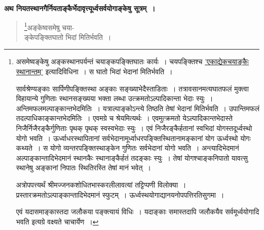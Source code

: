\documentclass[11pt, openany]{book}
\begin{document}
\newpage

\textbf{अथ नियतस्थानगैर्नियताङ्कैर्भेदावृत्त्यूर्ध्वसर्वयोगाङ्केषु सूत्रम्~।}

\begin{quote}
\renewcommand{\thefootnote}{१}\footnote{असमेष्वङ्केषु \;अङ्कस्थानपर्यन्तं \;चयाङ्कपङ्क्तिघातः \;कार्यः~। चयपङ्क्तिश्च \;\hyperref[13.10]{'एकाद्येकचयाङ्कैः \;स्थानान्तम्'} इत्यादिविधिना~। स घातो भिदां भेदानां मितिर्भवति~। 
\vspace{2mm}

\hspace{3mm} सार्वश्रेण्यङ्काः सार्पिणीपङ्क्तिस्था अङ्काः सङ्ख्याभेदैस्ताडिताः~। तत्रावसानमत्यघातफलं मुक्त्वा विहायान्ये गुणिताः स्थानसङ्ख्यया भक्ता लब्धा उत्क्रमतोऽल्पादिकान्ता भेदाः स्युः~। अन्तिमफलमल्पाङ्कान्तभेदमितिः~। यत्राल्पाङ्कोऽन्त्ये तिष्ठति तेषां भेदानां मितिर्भवति~। उपान्तिमफलं तदल्पाधिकाङ्कान्तभेदमितिः~। एवमग्रे च श्रेयमित्यर्थः~। एवमुत्क्रमतो येऽल्पादिकान्तभेदास्ते निजैर्निजैरङ्कैर्गुणिताः पृथक् पृथक् स्वस्वभेदाः स्युः~। एवं निजैरङ्कैर्हतानां स्वभिदां योगस्तदूर्ध्वस्थो योगो भवति~। ऊर्ध्वाधरस्थापितानां सर्वभेदानामूर्ध्वाधरपङ्क्तिस्थितानामङ्कानां योग ऊर्ध्वस्थो योगः कथ्यते~। स योगो व्यन्तरपङ्क्तिस्थाङ्केन गुणितः सर्वभेदानां योगो भवति~। अन्त्यादिभेदमानं अल्पाङ्कान्तादिभेदमानं स्थानकैः स्थानाङ्कैर्हतं तदङ्काः स्युः~। तेषां योगश्चाङ्कनिपातो यावत्सु स्थानेषु अङ्कानां निपातः स्थितिरस्ति तेषां मानं भवेत्~।
\vspace{2mm}

\hspace{3mm} अत्रोपपत्त्यर्थं श्रीमज्जनकशोधितभास्करलीलावत्यां तट्टिप्पणी विलोक्या~। प्रस्तारक्रमतोऽल्पाङ्कान्तादिभेदमानं स्फुटम्~। ऊर्ध्वस्थयोगाद्यानयनोपपत्तिरतिसुगमा~।
\vspace{2mm}

\hspace{3mm} एवं यदासमाङ्कास्तदा जलौकया पङ्क्त्यायं विधिः~। यदाङ्काः समास्तदापि जलौकयैव सर्वमूर्ध्वयोगादि भवति इत्यग्रे वक्ष्यते चाचार्येण~।}{\gk अङ्केष्वसमेषु चया-\\
ङ्केपङ्क्तिघातो भिदां मितिर्भवति~।}
\end{quote}

\newpage
\end{document}
